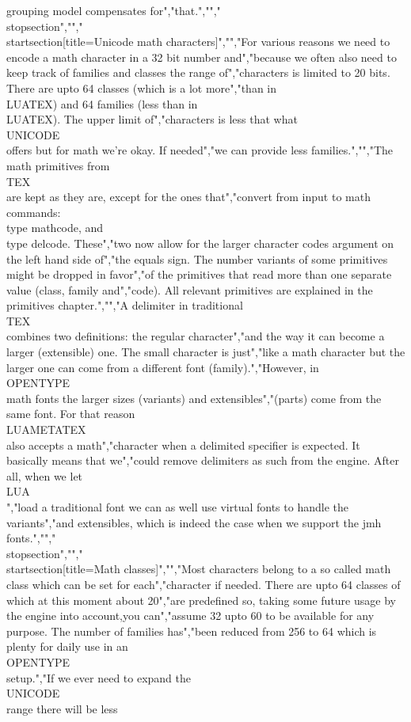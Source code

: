 grouping model compensates for","that.","","\\stopsection","","\\startsection[title={Unicode math characters}]","","For various reasons we need to encode a math character in a 32 bit number and","because we often also need to keep track of families and classes the range of","characters is limited to 20 bits. There are upto 64 classes (which is a lot more","than in \\LUATEX) and 64 families (less than in \\LUATEX). The upper limit of","characters is less that what \\UNICODE\\ offers but for math we're okay. If needed","we can provide less families.","","The math primitives from \\TEX\\ are kept as they are, except for the ones that","convert from input to math commands: \\type {mathcode}, and \\type {delcode}. These","two now allow for the larger character codes argument on the left hand side of","the equals sign. The number variants of some primitives might be dropped in favor","of the primitives that read more than one separate value (class, family and","code). All relevant primitives are explained in the primitives chapter.","","A delimiter in traditional \\TEX\\ combines two definitions: the regular character","and the way it can become a larger (extensible) one. The small character is just","like a math character but the larger one can come from a different font (family).","However, in \\OPENTYPE\\ math fonts the larger sizes (variants) and extensibles","(parts) come from the same font. For that reason \\LUAMETATEX\\ also accepts a math","character when a delimited specifier is expected. It basically means that we","could remove delimiters as such from the engine. After all, when we let \\LUA\\","load a traditional font we can as well use virtual fonts to handle the variants","and extensibles, which is indeed the case when we support the jmh fonts.","","\\stopsection","","\\startsection[title={Math classes}]","","Most characters belong to a so called math class which can be set for each","character if needed. There are upto 64 classes of which at this moment about 20","are predefined so, taking some future usage by the engine into account,you can","assume 32 upto 60 to be available for any purpose. The number of families has","been reduced from 256 to 64 which is plenty for daily use in an \\OPENTYPE\\ setup.","If we ever need to expand the \\UNICODE\\ range there will be less 